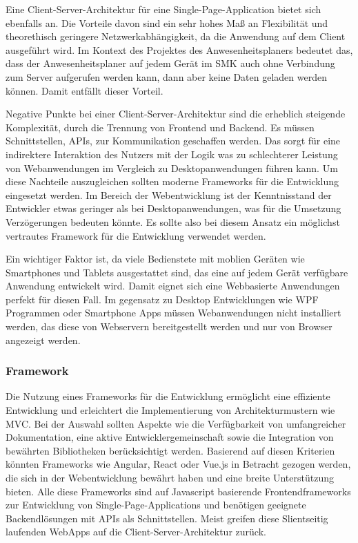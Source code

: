Eine Client-Server-Architektur für eine Single-Page-Application bietet sich ebenfalls an. Die Vorteile davon sind ein sehr hohes Maß an Flexibilität und theorethisch geringere Netzwerkabhängigkeit, da die Anwendung auf dem Client ausgeführt wird. Im Kontext des Projektes des Anwesenheitsplaners bedeutet das, dass der Anwesenheitsplaner auf jedem Gerät im SMK auch ohne Verbindung zum Server aufgerufen werden kann, dann aber keine Daten geladen werden können. Damit entfällt dieser Vorteil.

Negative Punkte bei einer Client-Server-Architektur sind die erheblich steigende Komplexität, durch die Trennung von Frontend und Backend. Es müssen Schnittstellen, \zB APIs, zur Kommunikation geschaffen werden. Das sorgt für eine indirektere Interaktion des Nutzers mit der Logik was zu schlechterer Leistung von Webanwendungen im Vergleich zu Desktopanwendungen führen kann. Um diese Nachteile auszugleichen sollten moderne Frameworks für die Entwicklung eingesetzt werden. Im Bereich der Webentwicklung ist der Kenntnisstand der Entwickler etwas geringer als bei Desktopanwendungen, was für die Umsetzung Verzögerungen bedeuten könnte. Es sollte also bei diesem Ansatz ein möglichst vertrautes Framework für die Entwicklung verwendet werden.

Ein wichtiger Faktor ist, da viele Bedienstete mit moblien Geräten wie Smartphones und Tablets ausgestattet sind, das eine auf jedem Gerät verfügbare Anwendung entwickelt wird. Damit eignet sich eine Webbasierte Anwendungen perfekt für diesen Fall. Im gegensatz zu Desktop Entwicklungen wie WPF Programmen oder Smartphone Apps müssen Webanwendungen nicht installiert werden, das diese von Webservern bereitgestellt werden und nur von Browser angezeigt werden.

\subsubsection{Framework}
\label{sec:Framework}
Die Nutzung eines Frameworks für die Entwicklung ermöglicht eine effiziente Entwicklung und erleichtert die Implementierung von Architekturmustern wie \zB MVC. Bei der Auswahl sollten Aspekte wie die Verfügbarkeit von umfangreicher Dokumentation, eine aktive Entwicklergemeinschaft sowie die Integration von bewährten Bibliotheken berücksichtigt werden. Basierend auf diesen Kriterien könnten Frameworks wie Angular, React oder Vue.js in Betracht gezogen werden, die sich in der Webentwicklung bewährt haben und eine breite Unterstützung bieten. Alle diese Frameworks sind auf Javascript basierende Frontendframeworks zur Entwicklung von Single-Page-Applications und benötigen geeignete Backendlösungen mit APIs als Schnittstellen. Meist greifen diese Slientseitig laufenden WebApps auf die Client-Server-Architektur zurück. %

